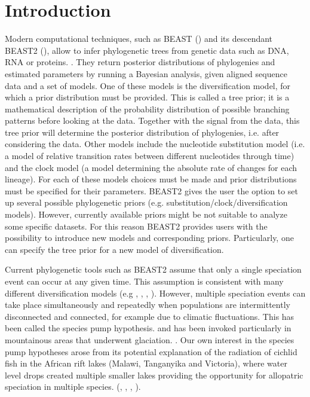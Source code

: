 \section{Introduction}

Modern computational techniques, such as BEAST (\cite{beast}) and its descendant 
BEAST2 (\cite{beast2}), allow to infer phylogenetic trees from genetic data 
such as DNA, RNA or proteins. . They 
return posterior distributions of phylogenies 
and estimated parameters by running a Bayesian analysis, 
given aligned sequence data and a set of models. 
One of these models is the diversification model, for which a prior distribution must be provided. This is called a tree prior; it is a mathematical description 
of the probability distribution of possible branching patterns before looking at the data. Together with the signal from the data, this tree prior will determine the posterior distribution of phylogenies, i.e. after considering the data. Other models include the nucleotide substitution model (i.e. a model of relative transition rates between different nucleotides through time) and the clock model (a model determining the absolute rate of changes for each lineage). For each of these models choices must be made and prior distributions must be specified for their parameters. BEAST2 gives the user the option to set up 
several possible phylogenetic 
priors (e.g. substitution/clock/diversification models). 
However, currently available priors 
might be not suitable to analyze some specific datasets.
For this reason BEAST2 provides users with the possibility 
to introduce new models and corresponding priors. Particularly, one can specify the tree prior for a new model of diversification.

Current phylogenetic tools such as BEAST2 assume that 
only a single speciation event can occur at any given time.
This assumption is consistent with many different diversification models (e.g \cite{Maddison2007biSSE}, \cite{Valente2015}, 
\cite{etienne2012diversity}, \cite{etienne2014estimating}). However, multiple speciation events can take place simultaneously and repeatedly when populations are intermittently disconnected and connected, for example due to climatic fluctuations. This has been called the species pump hypothesis. and has been invoked particularly in mountainous areas that underwent glaciation. . Our own interest in the species pump hypotheses arose from its potential explanation of the radiation of cichlid fish in the African rift lakes (Malawi, Tanganyika and Victoria), where water level drops created multiple smaller lakes providing the opportunity for allopatric speciation in multiple species.  (\citep{verheyen1996mitochondrial}, \citep{sturmbauer2001lake}, \citep{janzen2016}, \citep{janzen2017}).

